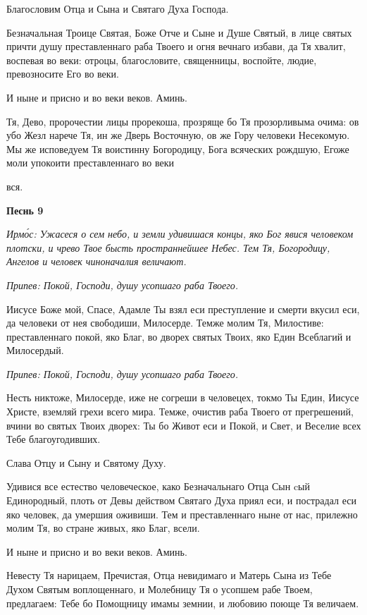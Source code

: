    Благословим Отца и Сына и Святаго Духа Господа.


   Безначальная Троице Святая, Боже Отче и Сыне и Душе Святый, в лице
святых причти душу преставленнаго раба Твоего и огня вечнаго избави, да
Тя хвалит, воспевая во веки: отроцы, благословите, священницы, воспойте,
людие, превозносите Его во веки.


   И ныне и присно и во веки веков. Аминь.


   Тя, Дево, пророчестии лицы прорекоша, прозряще бо Тя прозорливыма
очима: ов убо Жезл нарече Тя, ин же Дверь Восточную, ов же Гору
человеки Несекомую. Мы же исповедуем Тя воистинну Богородицу, Бога
всяческих рождшую, Егоже моли упокоити преставленнаго во веки

вся.



 

\bfseries Песнь 9\normalfont{}


 \itshape Ирмо́с:\normalfont{} Ужасеся о сем небо, и земли удивишася концы, яко Бог явися человеком
плотски, и чрево Твое бысть пространнейшее Небес. Тем Тя, Богородицу, Ангелов и
человек чиноначалия величают.


 \itshape Припев:\normalfont{} Покой, Господи, душу усопшаго раба Твоего.


   Иисусе Боже мой, Спасе, Адамле Ты взял еси преступление и смерти
вкусил еси, да человеки от нея свободиши, Милосерде. Темже молим Тя,
Милостиве: преставленнаго покой, яко Благ, во дворех святых Твоих, яко
Един Всеблагий и Милосердый.


 \itshape Припев:\normalfont{} Покой, Господи, душу усопшаго раба Твоего.


   Несть никтоже, Милосерде, иже не согреши в человецех, токмо Ты Един,
Иисусе Христе, вземляй грехи всего мира. Темже, очистив раба Твоего от
прегрешений, вчини во святых Твоих дворех: Ты бо Живот еси и Покой, и
Свет, и Веселие всех Тебе благоугодивших.


   Слава Отцу и Сыну и Святому Духу.


   Удивися все естество человеческое, како Безначальнаго Отца Сын cый
Единородный, плоть от Девы действом Святаго Духа приял еси, и пострадал
еси яко человек, да умершия оживиши. Тем и преставленнаго ныне от нас,
прилежно молим Тя, во стране живых, яко Благ, всели.


   И ныне и присно и во веки веков. Аминь.


   Невесту Тя нарицаем, Пречистая, Отца невидимаго и Матерь Сына из
Тебе Духом Святым воплощеннаго, и Молебницу Тя о усопшем рабе Твоем,
предлагаем: Тебе бо Помощницу имамы земнии, и любовию поюще Тя
величаем.


